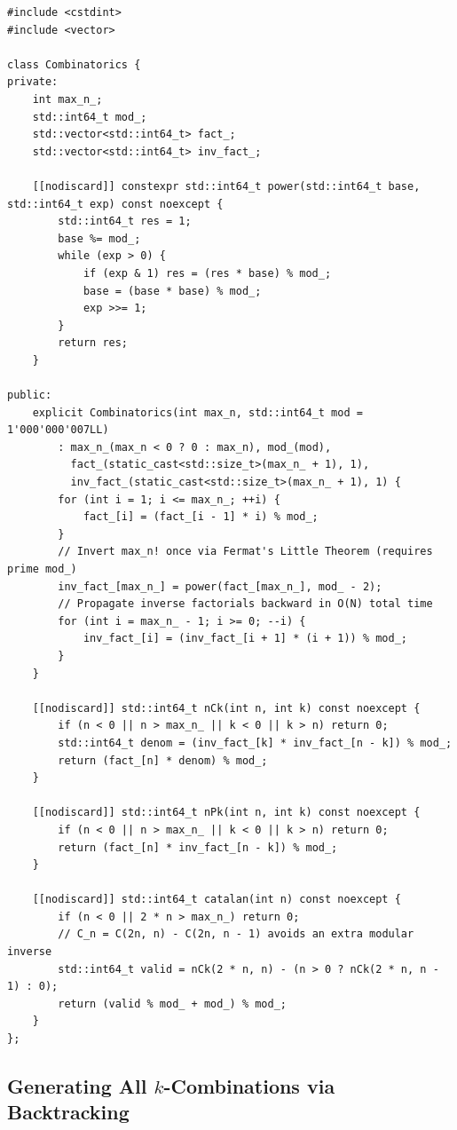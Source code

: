 \documentclass[11pt,a4paper]{article}
\theoremstyle{definition}
\begin{document}
\begin{lstlisting}[caption={O(1) Combinatorial Queries via Precomputed Factorials and Modular Inverses}]
#include <cstdint>
#include <vector>

class Combinatorics {
private:
    int max_n_;
    std::int64_t mod_;
    std::vector<std::int64_t> fact_;
    std::vector<std::int64_t> inv_fact_;

    [[nodiscard]] constexpr std::int64_t power(std::int64_t base, std::int64_t exp) const noexcept {
        std::int64_t res = 1;
        base %= mod_;
        while (exp > 0) {
            if (exp & 1) res = (res * base) % mod_;
            base = (base * base) % mod_;
            exp >>= 1;
        }
        return res;
    }

public:
    explicit Combinatorics(int max_n, std::int64_t mod = 1'000'000'007LL)
        : max_n_(max_n < 0 ? 0 : max_n), mod_(mod),
          fact_(static_cast<std::size_t>(max_n_ + 1), 1),
          inv_fact_(static_cast<std::size_t>(max_n_ + 1), 1) {
        for (int i = 1; i <= max_n_; ++i) {
            fact_[i] = (fact_[i - 1] * i) % mod_;
        }
        // Invert max_n! once via Fermat's Little Theorem (requires prime mod_)
        inv_fact_[max_n_] = power(fact_[max_n_], mod_ - 2);
        // Propagate inverse factorials backward in O(N) total time
        for (int i = max_n_ - 1; i >= 0; --i) {
            inv_fact_[i] = (inv_fact_[i + 1] * (i + 1)) % mod_;
        }
    }

    [[nodiscard]] std::int64_t nCk(int n, int k) const noexcept {
        if (n < 0 || n > max_n_ || k < 0 || k > n) return 0;
        std::int64_t denom = (inv_fact_[k] * inv_fact_[n - k]) % mod_;
        return (fact_[n] * denom) % mod_;
    }

    [[nodiscard]] std::int64_t nPk(int n, int k) const noexcept {
        if (n < 0 || n > max_n_ || k < 0 || k > n) return 0;
        return (fact_[n] * inv_fact_[n - k]) % mod_;
    }

    [[nodiscard]] std::int64_t catalan(int n) const noexcept {
        if (n < 0 || 2 * n > max_n_) return 0;
        // C_n = C(2n, n) - C(2n, n - 1) avoids an extra modular inverse
        std::int64_t valid = nCk(2 * n, n) - (n > 0 ? nCk(2 * n, n - 1) : 0);
        return (valid % mod_ + mod_) % mod_;
    }
};
\end{lstlisting}

\subsection{Generating All $k$-Combinations via Backtracking}
\end{document}
